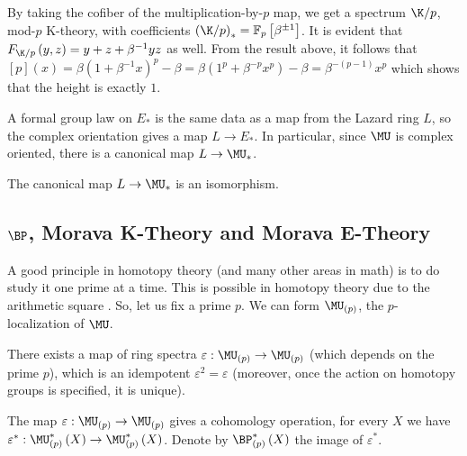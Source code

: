 
\begin{example}\label{cmplx-thy-3}
	By taking the cofiber of the multiplication-by-$p$ map, we get a spectrum $\K/p$, mod-$p$ K-theory, with coefficients $\left(\K/p\right)_* = \mathbb{F}_p \left[\beta^{\pm 1}\right]$.
	It is evident that $F_{\K/p}\left(y,z\right) = y + z + \beta^{-1} y z$ as well.
	From the result above, it follows that
	$
	\left[p\right]\left(x\right)
	= \beta \left(1 + \beta^{-1} x\right)^p - \beta
	= \beta \left(1^p + \beta^{-p} x^p\right) - \beta
	= \beta^{-\left(p-1\right)} x^p
	$
	which shows that the height is exactly $1$.
\end{example}

A formal group law on $E_*$ is the same data as a map from the Lazard ring $L$, so the complex orientation gives a map $L \to E_*$.
In particular, since $\MU$ is complex oriented, there is a canonical map $L \to \MU_*$.

\begin{theorem}\label{quillen-theorem}
	The canonical map $L \to \MU_*$ is an isomorphism.
\end{theorem}



\subsection{\texorpdfstring{$\BP$}{BP}, Morava K-Theory and Morava E-Theory}

A good principle in homotopy theory (and many other areas in math) is to do study it one prime at a time.
This is possible in homotopy theory due to the arithmetic square .
So, let us fix a prime $p$.
We can form $\MU_{\left(p\right)}$, the $p$-localization of $\MU$.

\begin{theorem}
	There exists a map of ring spectra $\varepsilon: \MU_{\left(p\right)} \to \MU_{\left(p\right)}$ (which depends on the prime $p$), which is an idempotent $\varepsilon^2 = \varepsilon$ (moreover, once the action on homotopy groups is specified, it is unique).
\end{theorem}

The map $\varepsilon: \MU_{\left(p\right)} \to \MU_{\left(p\right)}$ gives a cohomology operation, for every $X$ we have $\varepsilon^*: \MU_{\left(p\right)}^*\left(X\right) \to \MU_{\left(p\right)}^*\left(X\right)$.
Denote by $\BP_{\left(p\right)}^*\left(X\right)$ the image of $\varepsilon^*$.

